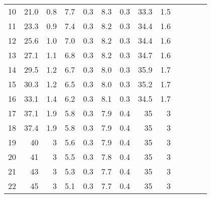 \begin{tabular}{lrrrrrrrrrrrr}
	10 & 21.0              & 0.8                      & 7.7                & 0.3                       & 8.3                & 0.3                       & 33.3                   & 1.5                           \\
	11 & 23.3              & 0.9                      & 7.4                & 0.3                       & 8.2                & 0.3                       & 34.4                   & 1.6                           \\
	12 & 25.6              & 1.0                      & 7.0                & 0.3                       & 8.2                & 0.3                       & 34.4                   & 1.6                           \\
	13 & 27.1              & 1.1                      & 6.8                & 0.3                       & 8.2                & 0.3                       & 34.7                   & 1.6                           \\
	14 & \color{red}29.5   & 1.2                      & 6.7                & 0.3                       & 8.0                & 0.3                       & \color{red}35.9        & 1.7                           \\
	15 & 30.3              & 1.2                      & 6.5                & 0.3                       & 8.0                & 0.3                       & 35.2                   & 1.7                           \\
	16 & 33.1              & 1.4                      & 6.2                & 0.3                       & 8.1                & 0.3                       & 34.5                   & 1.7                           \\
	17 & 37.1              & 1.9                      & 5.8                & 0.3                       & 7.9                & 0.4                       & 35                     & 3                             \\
	18 & 37.4              & 1.9                      & 5.8                & 0.3                       & 7.9                & 0.4                       & 35                     & 3                             \\
	19 & 40                & 3                        & 5.6                & 0.3                       & 7.9                & 0.4                       & 35                     & 3                             \\
	20 & 41                & 3                        & 5.5                & 0.3                       & 7.8                & 0.4                       & 35                     & 3                             \\
	21 & 43                & 3                        & 5.3                & 0.3                       & 7.7                & 0.4                       & 35                     & 3                             \\
	22 & 45                & 3                        & 5.1                & 0.3                       & 7.7                & 0.4                       & 35                     & 3                             \\
	\bottomrule
\end{tabular}
